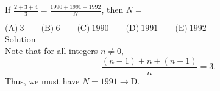 

If $\frac{2+3+4}{3}=\frac{1990+1991+1992}{N}$, then $N=$

$\text{(A)}\ 3 \qquad \text{(B)}\ 6 \qquad \text{(C)}\ 1990 \qquad \text{(D)}\ 1991 \qquad \text{(E)}\ 1992$
\\
Solution
\\
Note that for all integers $n\neq 0$, \[\frac{(n-1)+n+(n+1)}{n}=3.\] Thus, we must have $N=1991\rightarrow \boxed{\text{D}}$.
